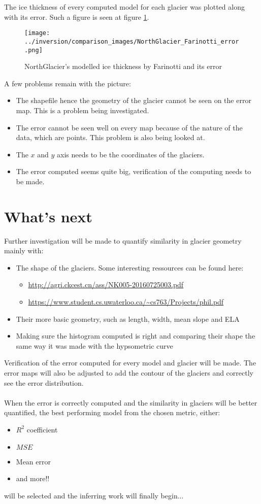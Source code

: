 \documentclass[a4, 12pt]{article}
\begin{document}
The ice thickness of every computed model for each glacier was plotted along with its error. Such a figure is seen at figure \ref{fig:ng_error}.
\begin{figure}[h!]
	\centering
	\texttt{[image: ../inversion/comparison\_images/NorthGlacier\_Farinotti\_error.png]}
	\caption{NorthGlacier's modelled ice thickness by Farinotti and its error}
	\label{fig:ng_error}
\end{figure}
A few problems remain with the picture:
\begin{itemize}
\item The shapefile hence the geometry of the glacier cannot be seen on the error map. This is a problem being investigated.
\item The error cannot be seen well on every map because of the nature of the data, which are points. This problem is also being looked at.
\item The $x$ and $y$ axis needs to be the coordinates of the glaciers.
\item The error computed seems quite big, verification of the computing needs to be made.
\end{itemize}
\section{What's next}
Further investigation will be made to quantify similarity in glacier geometry mainly with:\\
\begin{itemize}
	\item The shape of the glaciers. Some interesting ressources can be found here:
	\begin{itemize}
		\item \url{http://agri.ckcest.cn/ass/NK005-20160725003.pdf}
		\item \url{https://www.student.cs.uwaterloo.ca/~cs763/Projects/phil.pdf}
	\end{itemize}
	\item Their more basic geometry, such as length, width, mean slope and ELA
	\item Making sure the histogram computed is right and comparing their shape the same way it was made with the hypsometric curve
\end{itemize}
Verification of the error computed for every model and glacier will be made. The error maps will also be adjusted to add the contour of the glaciers and correctly see the error distribution.\\
\\
When the error is correctly computed and the similarity in glaciers will be better quantified, the best performing model from the chosen metric, either:
\begin{itemize}
\item $R^2$ coefficient
\item $MSE$
\item Mean error
\item and more!!
\end{itemize}
will be selected and the inferring work will finally begin...
\end{document}
